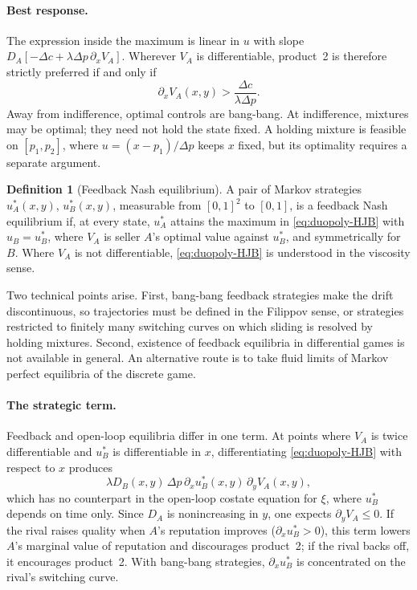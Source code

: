 \documentclass[11pt]{article}
\theoremstyle{definition}
\newtheorem{definition}{Definition}
\begin{document}
\paragraph{Best response.}
The expression inside the maximum is linear in $u$ with slope
$D_A[-\Delta c+\lambda\Delta p\,\partial_xV_A]$. Wherever $V_A$ is
differentiable, product~2 is therefore strictly preferred if and only if
\begin{equation*}
\partial_xV_A(x,y)>\frac{\Delta c}{\lambda\Delta p}.
\end{equation*}
Away from indifference, optimal controls are bang-bang. At indifference,
mixtures may be optimal; they need not hold the state fixed. A holding
mixture is feasible on $[p_1,p_2]$, where $u=(x-p_1)/\Delta p$ keeps $x$
fixed, but its optimality requires a separate argument.

\begin{definition}[Feedback Nash equilibrium]
A pair of Markov strategies $u_A^*(x,y)$, $u_B^*(x,y)$, measurable from
$[0,1]^2$ to $[0,1]$, is a feedback Nash equilibrium if, at every state,
$u_A^*$ attains the maximum in \eqref{eq:duopoly-HJB} with $u_B=u_B^*$,
where $V_A$ is seller $A$'s optimal value against $u_B^*$, and symmetrically
for $B$. Where $V_A$ is not differentiable, \eqref{eq:duopoly-HJB} is
understood in the viscosity sense.
\end{definition}

Two technical points arise. First, bang-bang feedback strategies make the
drift discontinuous, so trajectories must be defined in the Filippov sense,
or strategies restricted to finitely many switching curves on which sliding
is resolved by holding mixtures. Second, existence of feedback equilibria in
differential games is not available in general. An alternative route is to
take fluid limits of Markov perfect equilibria of the discrete game.

\paragraph{The strategic term.}
Feedback and open-loop equilibria differ in one term. At points where $V_A$
is twice differentiable and $u_B^*$ is differentiable in $x$,
differentiating \eqref{eq:duopoly-HJB} with respect to $x$ produces
\begin{equation*}
\lambda D_B(x,y)\,\Delta p\,\partial_xu_B^*(x,y)\,\partial_yV_A(x,y),
\end{equation*}
which has no counterpart in the open-loop costate equation for $\xi$,
where $u_B^*$ depends on time only. Since $D_A$ is nonincreasing in $y$, one
expects $\partial_yV_A\leq0$. If the rival raises quality when $A$'s
reputation improves ($\partial_xu_B^*>0$), this term lowers $A$'s marginal
value of reputation and discourages product~2; if the rival backs off, it
encourages product~2. With bang-bang strategies, $\partial_xu_B^*$ is
concentrated on the rival's switching curve.
\end{document}
